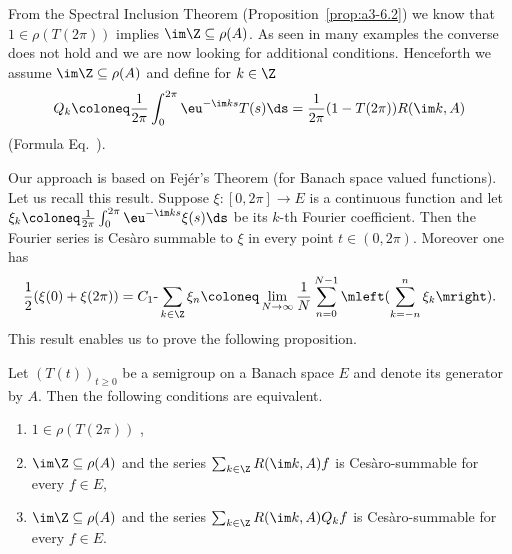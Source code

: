 From the Spectral Inclusion Theorem (Proposition~\ref{prop:a3-6.2}) we know that $1 \in \rho(T(2\pi))$ implies $\im\Z \subseteq \rho(A)$.
As seen in many examples the converse does not hold and we are now looking for additional conditions.
Henceforth we assume $\im\Z \subseteq \rho(A)$ and define for $k \in \Z$
\begin{equation}\label{eq:a3-7.7}
Q_{k}\coloneq \frac{1}{2\pi}\int_{0}^{2\pi} \eu^{-\im ks}T(s)\ds = \frac{1}{2\pi}(1 - T(2\pi))R(\im k,A)
\end{equation}
(\cf Formula Eq.~).

Our approach is based on Fejér's Theorem (for Banach space valued functions).
Let us recall this result.
Suppose $\xi \colon [0,2\pi] \to E$ is a continuous function and let $\xi_{k}\coloneq \frac{1}{2\pi}\int_{0}^{2\pi} \eu^{-\im ks}\xi(s)\ds$ be its $k$-th Fourier coefficient.
Then the Fourier series is Cesàro summable to $\xi$ in every point $t \in (0,2\pi)$.
Moreover one has
\begin{equation}\label{eq:a3-7.8}
\frac{1}{2}(\xi(0) + \xi(2\pi)) = C_{1}\text{-}\sum_{k\in\Z} \xi_{n} \coloneq \lim_{N\to\infty} \frac{1}{N}\sum_{n=0}^{N-1}\mleft( \sum_{k=-n}^{n} \xi_{k} \mright) .
\end{equation}
This result enables us to prove the following proposition.
\begin{proposition}\label{prop:a3-7.8}
%
Let $(T(t))_{t\geq 0}$ be a semigroup on a Banach space $E$ and denote its generator by $A$.
Then the following conditions are equivalent.
\begin{enumerate}[\upshape (a)]

\item $1 \in \rho(T(2\pi))$ ,

\item 
$\im\Z \subseteq \rho(A)$ and the series $\sum_{k\in\Z} R(\im k,A)f$ is Cesàro-summable for every $f \in E$,

\item 
$\im\Z \subseteq \rho(A)$ and the series $\sum_{k\in\Z} R(\im k,A)Q_{k}f$ is Cesàro-summable for every $f \in E$. 

\end{enumerate}
\end{proposition}
